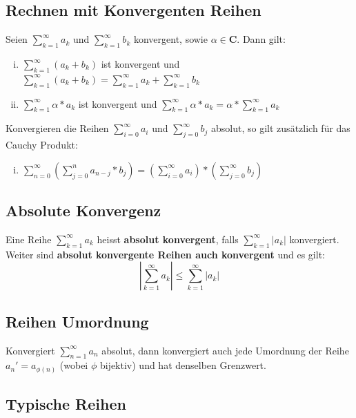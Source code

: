 \documentclass[8pt]{article}
\begin{document}
\begin{multicols*}{3}
\subsection{Rechnen mit Konvergenten Reihen}
Seien $\sum_{k = 1}^\infty a_k$ und $\sum_{k = 1}^\infty b_k$ konvergent, sowie $\alpha \in \mathbf{C}$.
Dann gilt:
\begin{enumerate}[(i)]
  \item $\sum_{k = 1}^\infty (a_k + b_k)$ ist konvergent und $\sum_{k = 1}^\infty (a_k + b_k) = \sum_{k = 1}^\infty a_k + \sum_{k = 1}^\infty b_k$
  \item $\sum_{k = 1}^\infty \alpha * a_k$ ist konvergent und $\sum_{k = 1}^\infty \alpha * a_k = \alpha * \sum_{k = 1}^\infty a_k$
\end{enumerate}
Konvergieren die Reihen $\sum_{i = 0}^\infty a_i$ und $\sum_{j = 0}^\infty b_j$ absolut,
so gilt zusätzlich für das Cauchy Produkt:
\begin{enumerate}[(iii)]
  \item $\sum_{n = 0}^\infty (\sum_{j = 0}^n a_{n - j} * b_j) = (\sum_{i = 0}^\infty a_i) * (\sum_{j = 0}^\infty b_j)$
\end{enumerate}
\subsection {Absolute Konvergenz}
Eine Reihe $\sum_{k = 1}^{\infty} a_k$ heisst \textbf{absolut konvergent},
falls $\sum_{k = 1}^{\infty} |a_k|$ konvergiert. Weiter sind \textbf{absolut konvergente Reihen
auch konvergent} und es gilt:
$$
  \left| \sum_{k = 1}^{\infty} a_k \right| \leq \sum_{k = 1}^{\infty} |a_k|
$$

\subsection{Reihen Umordnung}

Konvergiert $\sum_{n = 1}^\infty a_n$ absolut, dann konvergiert auch jede Umordnung
der Reihe $a_n' = a_{\phi(n)}$ (wobei $\phi$ bijektiv) und hat denselben Grenzwert.

\subsection{Typische Reihen}


\end{multicols*}
\end{document}
